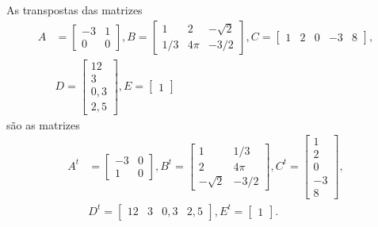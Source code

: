 \documentclass{beamer}
\begin{document}
  \begin{frame}
    \begin{exemplos}
      As transpostas das matrizes
      \begin{eqnarray*}
        A &= \begin{bmatrix}
            -3 & 1\\
            0 & 0
          \end{bmatrix},
          B = \begin{bmatrix}
            1 & 2 & -\sqrt{2}\\
            1/3 & 4\pi & -3/2
          \end{bmatrix},
          C = \begin{bmatrix}
            1 & 2 & 0 & -3 & 8
          \end{bmatrix},\\
          &D = \begin{bmatrix}
            12\\
            3\\
            0,3\\
            2,5
          \end{bmatrix},
          E = \begin{bmatrix}
            1
          \end{bmatrix}
      \end{eqnarray*}
      são as matrizes
      \begin{eqnarray*}
        A^t &= \begin{bmatrix}
            -3 & 0\\
            1 & 0
          \end{bmatrix},
          B^t = \begin{bmatrix}
            1 & 1/3\\
            2 & 4\pi\\
            -\sqrt{2} & -3/2
          \end{bmatrix},
          C^t= \begin{bmatrix}
            1 \\ 2 \\ 0 \\ -3 \\ 8
          \end{bmatrix},\\
          &D^t = \begin{bmatrix}
            12 & 3 & 0,3 & 2,5
          \end{bmatrix},
          E^t = \begin{bmatrix}
            1
          \end{bmatrix}.
      \end{eqnarray*}
    \end{exemplos}
  \end{frame}
\end{document}
